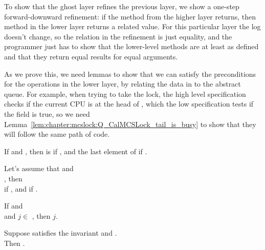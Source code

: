 To show that the ghost layer refines the previous layer, we show a
one-step forward-downward refinement: if the method from the higher
layer returns, then method in the lower layer returns a related
value. For this particular layer the log doesn't change, so the
relation in the refinement is just equality, and the programmer just
has to show that the lower-level methods are at least as defined and
that they return equal results for equal arguments.


As we prove this, we need lemmas to show that we can satisfy the preconditions for the operations in the lower layer, by relating the data in  to the abstract queue.  For example, when trying to take the lock, the high level specification checks if the current CPU is at the head of , which the low specification tests if the  field is true, so we need Lemma~\ref{lem:chapter:mcslock:Q_CalMCSLock_tail_is_busy} to show that they will follow the same path of code. 

\begin{lemma}
If  and , then  is  if , and  the last element of  if .
\end{lemma}

\begin{lemma}
Let's assume that  and \\
, 
 then\\
  if , and 
 if .
\end{lemma}

\begin{lemma}
\label{lem:chapter:mcslock:Q_CalMCSLock_tail_is_busy}

    If  and \\
     and $j \in$ , then \code{lock$\_$array[}$j$\code{] = (true, $\_$)}.
\end{lemma}

\begin{theorem} 
Suppose  satisfies the invariant and
.\\
 Then .
\end{theorem}


